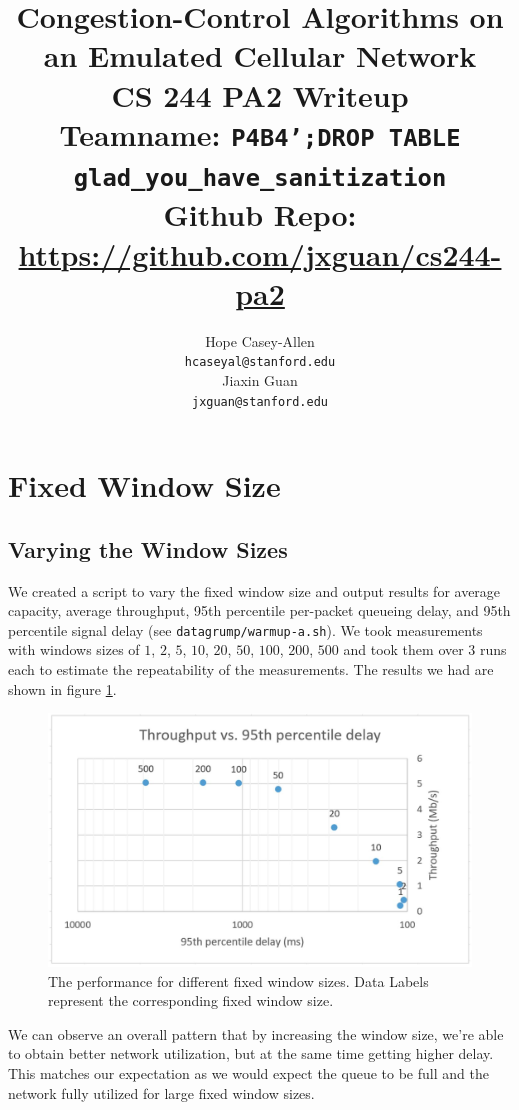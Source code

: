 \documentclass[11pt,a4paper]{article}
\title{ %
  Congestion-Control Algorithms on an Emulated Cellular Network\\
\large CS 244 PA2 Writeup \\
Teamname: \texttt{P4B4';DROP TABLE glad\_you\_have\_sanitization}\\
Github Repo: \url{https://github.com/jxguan/cs244-pa2}}
\author{Hope Casey-Allen  \\
  {\tt hcaseyal@stanford.edu} \\\And
  Jiaxin Guan \\
  {\tt jxguan@stanford.edu} \\}
\date{}
\begin{document}
\maketitle



\section{Fixed Window Size}
\label{sec:fixed}

\subsection{Varying the Window Sizes}
We created a script to vary the fixed window size and output results for average
capacity, average throughput, 95th percentile per-packet queueing delay, and
95th percentile signal delay (see \texttt{datagrump/warmup-a.sh}). We took measurements
with windows sizes of $1$, $2$, $5$, $10$, $20$, $50$, $100$, $200$, $500$ and
took them over $3$ runs
each to estimate the repeatability of the measurements. The results we had are
shown in figure \ref{fig:warmup-a}.
\begin{figure}[h]
  \centering
  \includegraphics[scale=0.15]{warmup-a}
  \caption{The performance for different fixed window sizes. Data Labels
  represent the corresponding fixed window size.}
  \label{fig:warmup-a}
\end{figure}

We can observe an overall pattern that by increasing the window size, we're able
to obtain better network utilization, but at the same time getting higher delay.
This matches our expectation as we would expect the queue to be full and the
network fully utilized for large fixed window sizes.
\end{document}
